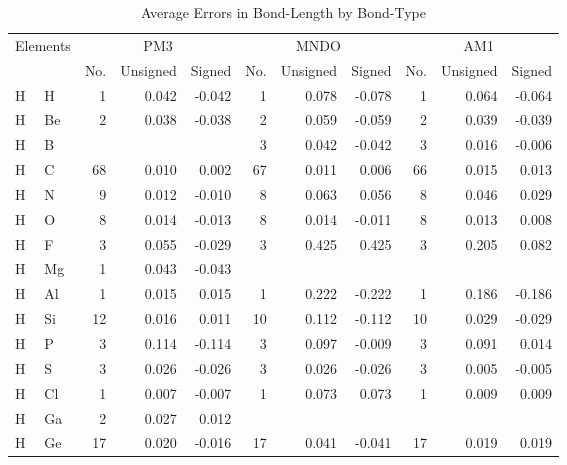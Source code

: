\begin{table}
\caption{\label{avegeos} Average Errors in Bond-Length by Bond-Type} 
\compresstable
\begin{center}
\begin{tabular}{llrrrrrrrrr}
\multicolumn{2}{c}{Elements} & \multicolumn{3}{c}{PM3} &
\multicolumn{3}{c}{MNDO} & \multicolumn{3}{c}{AM1} \\
 & &  No. & Unsigned & Signed & No. & Unsigned & Signed & No. & Unsigned & Signed  \\ \hline
  H &   H &   1 &    0.042 &   -0.042 &   1 &    0.078 &   -0.078 &   1 &    0.064 &   -0.064 \\
  H &  Be &   2 &    0.038 &   -0.038 &   2 &    0.059 &   -0.059 &   2 &    0.039 &   -0.039 \\
  H &   B &     &          &          &   3 &    0.042 &   -0.042 &   3 &    0.016 &   -0.006 \\
  H &   C &  68 &    0.010 &    0.002 &  67 &    0.011 &    0.006 &  66 &    0.015 &    0.013 \\
  H &   N &   9 &    0.012 &   -0.010 &   8 &    0.063 &    0.056 &   8 &    0.046 &    0.029 \\
  H &   O &   8 &    0.014 &   -0.013 &   8 &    0.014 &   -0.011 &   8 &    0.013 &    0.008 \\
  H &   F &   3 &    0.055 &   -0.029 &   3 &    0.425 &    0.425 &   3 &    0.205 &    0.082 \\
  H &  Mg &   1 &    0.043 &   -0.043 &     &          &          &     &          &          \\
  H &  Al &   1 &    0.015 &    0.015 &   1 &    0.222 &   -0.222 &   1 &    0.186 &   -0.186 \\
  H &  Si &  12 &    0.016 &    0.011 &  10 &    0.112 &   -0.112 &  10 &    0.029 &   -0.029 \\
  H &   P &   3 &    0.114 &   -0.114 &   3 &    0.097 &   -0.009 &   3 &    0.091 &    0.014 \\
  H &   S &   3 &    0.026 &   -0.026 &   3 &    0.026 &   -0.026 &   3 &    0.005 &   -0.005 \\
  H &  Cl &   1 &    0.007 &   -0.007 &   1 &    0.073 &    0.073 &   1 &    0.009 &    0.009 \\
  H &  Ga &   2 &    0.027 &    0.012 &     &          &          &     &          &          \\
  H &  Ge &  17 &    0.020 &   -0.016 &  17 &    0.041 &   -0.041 &  17 &    0.019 &    0.019 \\

\end{tabular}
\end{center}
\end{table}
